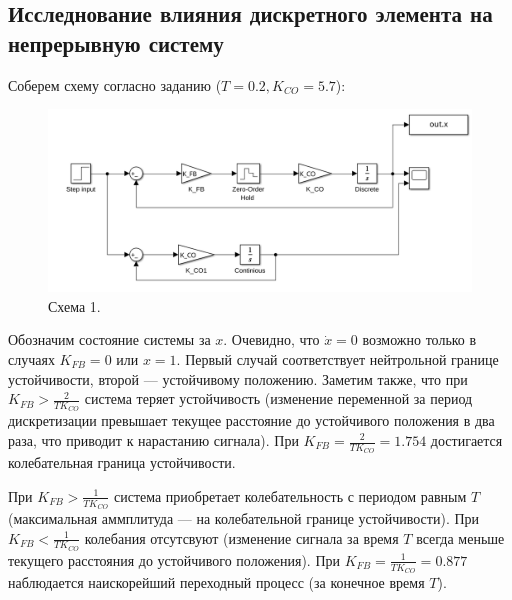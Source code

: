 \documentclass[a4paper, 14pt]{extarticle}
\theoremstyle{definition}
\theoremstyle{plain}
\theoremstyle{remark}
\begin{document}
\subsection{Исследнование влияния дискретного элемента на непрерывную систему}
Соберем схему согласно заданию ($T=0.2, K_{CO}=5.7$):
\begin{figure}
    [H]
    \centering
    \includegraphics[width=\textwidth]{images/scheme_1.png}
    \caption{Схема 1.}
    \label{fig:scheme_1}
\end{figure}

Обозначим состояние системы за $x$. Очевидно, что $\dot{x}=0$ возможно только в случаях $K_{FB}=0$ или $x=1$. Первый случай соответствует нейтрольной границе устойчивости, второй --- устойчивому положению. Заметим также, что при $K_{FB}>\frac{2}{TK_{CO}}$ система теряет устойчивость (изменение переменной за период дискретизации превышает текущее расстояние до устойчивого положения в два раза, что приводит к нарастанию сигнала). При $K_{FB}=\frac{2}{TK_{CO}}=1.754$ достигается колебательная граница устойчивости.

При $K_{FB}>\frac{1}{TK_{CO}}$ система приобретает колебательность с периодом равным $T$ (максимальная аммплитуда --- на колебательной границе устойчивости). При $K_{FB}<\frac{1}{TK_{CO}}$ колебания отсутсвуют (изменение сигнала за время $T$ всегда меньше текущего расстояния до устойчивого положения). При $K_{FB}=\frac{1}{TK_{CO}}=0.877$ наблюдается наискорейший переходный процесс (за конечное время $T$).
\end{document}
